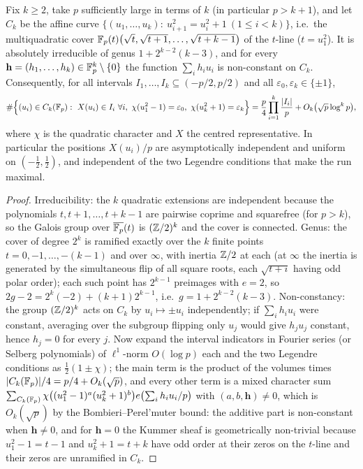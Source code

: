 
\begin{lemma}\label{lem:run}
Fix $k\ge2$, take $p$ sufficiently large in terms of $k$ (in particular $p>k+1$), and let $C_k$ be the affine curve
$\{(u_1,\dots,u_k):\ u_{i+1}^2=u_i^2+1\ (1\le i<k)\}$, i.e.\ the multiquadratic cover
$\mathbb{F}_p(t)\bigl(\sqrt t,\sqrt{t+1},\dots,\sqrt{t+k-1}\bigr)$ of the $t$-line ($t=u_1^2$).  It is absolutely irreducible of genus
$1+2^{k-2}(k-3)$, and for every $\mathbf h=(h_1,\dots,h_k)\in\mathbb{F}_p^k\setminus\{0\}$ the function $\sum_ih_iu_i$ is non-constant on $C_k$.
Consequently, for all intervals $I_1,\dots,I_k\subseteq(-p/2,p/2)$ and all $\varepsilon_0,\varepsilon_k\in\{\pm1\}$,
\[
 \#\Bigl\{(u_i)\in C_k(\Fp):\ X(u_i)\in I_i\ \forall i,\ \chi(u_1^2-1)=\varepsilon_0,\ \chi(u_k^2+1)=\varepsilon_k\Bigr\}
 =\frac p4\prod_{i=1}^k\frac{|I_i|}p+O_k\bigl(\sqrt p\log^kp\bigr),
\]
where $\chi$ is the quadratic character and $X$ the centred representative.  In particular the positions $X(u_i)/p$ are asymptotically
independent and uniform on $(-\frac12,\frac12)$, and independent of the two Legendre conditions that make the run maximal.
\end{lemma}
\begin{proof}
Irreducibility: the $k$ quadratic extensions are independent because the polynomials $t,t+1,\dots,t+k-1$ are pairwise coprime and squarefree
(for $p>k$), so the Galois group over $\overline{\mathbb{F}_p}(t)$ is $(\mathbb{Z}/2)^k$ and the cover is connected.  Genus: the cover of degree $2^k$ is
ramified exactly over the $k$ finite points $t=0,-1,\dots,-(k-1)$ and over $\infty$, with inertia $\mathbb{Z}/2$ at each (at $\infty$ the inertia is
generated by the simultaneous flip of all square roots, each $\sqrt{t+i}$ having odd polar order); each such point has $2^{k-1}$ preimages
with $e=2$, so $2g-2=2^k(-2)+(k+1)2^{k-1}$, i.e.\ $g=1+2^{k-2}(k-3)$.  Non-constancy: the group $(\mathbb{Z}/2)^k$ acts on $C_k$ by
$u_i\mapsto\pm u_i$ independently; if $\sum_ih_iu_i$ were constant, averaging over the subgroup flipping only $u_j$ would give $h_ju_j$
constant, hence $h_j=0$ for every $j$.  Now expand the interval indicators in Fourier series (or Selberg polynomials) of $\ell^1$-norm
$O(\log p)$ each and the two Legendre conditions as $\frac12(1\pm\chi)$; the main term is the product of the volumes times
$|C_k(\mathbb{F}_p)|/4=p/4+O_k(\sqrt p)$, and every other term is a mixed character sum
$\sum_{C_k(\mathbb{F}_p)}\chi\bigl((u_1^2-1)^{a}(u_k^2+1)^{b}\bigr)e\bigl(\sum_ih_iu_i/p\bigr)$ with $(a,b,\mathbf h)\ne0$, which is $O_k(\sqrt p)$ by the
Bombieri--Perel'muter bound: the additive part is non-constant when $\mathbf h\ne0$, and for $\mathbf h=0$ the Kummer sheaf is geometrically
non-trivial because $u_1^2-1=t-1$ and $u_k^2+1=t+k$ have odd order at their zeros on the $t$-line and their zeros are unramified in $C_k$.
\end{proof}

